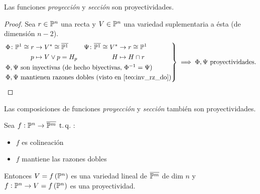 \begin{col}
    Las funciones \textit{proyección} y \textit{sección} son proyectividades.
\end{col}
\begin{proof}
    Sea $r \in \mathbb{P}^n$ una recta y $V \in \mathbb{P}^n$ una variedad suplementaria a ésta
    (de dimensión $n-2$). %
    \[
        \begin{rcases}
            \begin{aligned}
            \Phi \colon \mathbb{P}^1 \cong r &\to V^\ast \cong \overline{\mathbb{P}^1} \\
            p &\mapsto V \vee p = H_p
            \end{aligned}
            \quad
            \begin{aligned}
            \Psi \colon \overline{\mathbb{P}^1} \cong V^* &\to r \cong \mathbb{P}^1 \\ H &\mapsto H \cap r
            \end{aligned} \\
            \Phi, \Psi \text{ son inyectivas (de hecho biyectivas, } \Phi^{-1} = \Psi
            \text{)}\\
            \Phi, \Psi \text{ mantienen razones dobles (visto en \ref{teo:inv_rz_do})}
    \end{rcases}
    \implies
    \Phi, \Psi \text{ proyectividades.}
 \]
\end{proof}
\begin{obs}
    Las composiciones de funciones \textit{proyección} y \textit{sección} también son proyectividades.
\end{obs}
\begin{prop} \label{prop:demo_teo2}
    Sea $f : \mathbb{P}^n \to \overline{\mathbb{P}^m} \operatorname{\;t.q.\;}$:
    \begin{itemize}
        \item $f$ es colineación
        \item $f$ mantiene las razones dobles
    \end{itemize}
    Entonces $V = f \left( \mathbb{P}^n \right)$ es una variedad lineal de $\overline{\mathbb{P}^m}$ de dim $n$ y $f : \mathbb{P}^n \to V = f \left( \mathbb{P}^n \right)$ es una proyectividad.
\end{prop}
